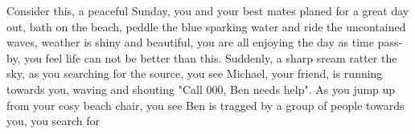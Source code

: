 Consider this, a peaceful Sunday, you and your best mates planed for a great day out, bath on the beach, peddle the blue sparking water and ride the uncontained waves, weather is shiny and beautiful, you are all enjoying the day as time pass-by, you feel life can not be better than this. Suddenly, a sharp sream ratter the sky, as you searching for the source, you see Michael, your friend, is running towards you, waving and shouting "Call 000, Ben needs help". As you jump up from your cosy beach chair, you see Ben is tragged by a group of people towards you, you search for